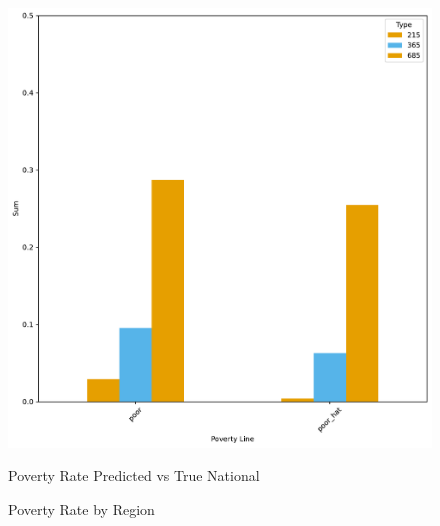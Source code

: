 \begin{figure}[H]
    \centering
    \caption{Poverty Rate Predicted vs True National}
    \includegraphics[width=\textwidth]{../figures/fig3_prediction_vs_true_poverty_rate_national.pdf}
    \label{fig:enter-label}
\end{figure}



\begin{figure}[H]
    \centering
    \caption{Poverty Rate by Region}
    \label{fig:enter-label}
\end{figure}



